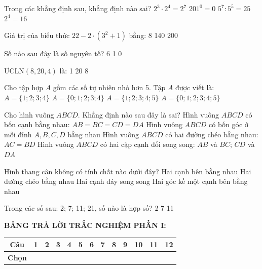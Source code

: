 \documentclass[12pt,a4paper]{article}
\begin{document}
\begin{ex}
Trong các khẳng định sau, khẳng định nào sai?
\choice
{$2^3 \cdot 2^4 = 2^7$}
{\True $201^0 = 0$}
{$5^7 : 5^5 = 25$}
{$2^4 = 16$}
\end{ex}

\begin{ex}
Giá trị của biểu thức $22 - 2 \cdot (3^2 + 1)$ bằng:
\choice
{8}
{140}
{200}
{}
\end{ex}

\begin{ex}
Số nào sau đây là số nguyên tố?
\choice
{6}
{1}
{}
{0}
\end{ex}

\begin{ex}
$\text{ƯCLN}(8, 20, 4)$ là:
\choice
{1}
{20}
{}
{8}
\end{ex}

\begin{ex}
Cho tập hợp $A$ gồm các số tự nhiên nhỏ hơn 5. Tập $A$ được viết là:
\choice
{$A = \{1; 2; 3; 4\}$}
{\True $A = \{0; 1; 2; 3; 4\}$}
{$A = \{1; 2; 3; 4; 5\}$}
{$A = \{0; 1; 2; 3; 4; 5\}$}
\end{ex}

\begin{ex}
Cho hình vuông $ABCD$. Khẳng định nào sau đây là sai?
\choice
{Hình vuông $ABCD$ có bốn cạnh bằng nhau: $AB = BC = CD = DA$}
{Hình vuông $ABCD$ có bốn góc ở mỗi đỉnh $A, B, C, D$ bằng nhau}
{Hình vuông $ABCD$ có hai đường chéo bằng nhau: $AC = BD$}
{\True Hình vuông $ABCD$ có hai cặp cạnh đối song song: $AB$ và $BC$; $CD$ và $DA$}
\end{ex}

\begin{ex}
Hình thang cân không có tính chất nào dưới đây?
\choice
{Hai cạnh bên bằng nhau}
{Hai đường chéo bằng nhau}
{Hai cạnh đáy song song}
{\True Hai góc kề một cạnh bên bằng nhau}
\end{ex}

\begin{ex}
Trong các số sau: 2; 7; 11; 21, số nào là hợp số?
\choice
{2}
{7}
{}
{11}
\end{ex}


\vspace{1mm}
\noindent\textbf{BẢNG TRẢ LỜI TRẮC NGHIỆM PHẦN I:}
\begin{center}
\begin{tabular}{|c|c|c|c|c|c|c|c|c|c|c|c|c|}
\hline
\textbf{Câu} & \textbf{1} & \textbf{2} & \textbf{3} & \textbf{4} & \textbf{5} & \textbf{6} & \textbf{7} & \textbf{8} & \textbf{9} & \textbf{10} & \textbf{11} & \textbf{12} \\
\hline
\textbf{Chọn} & \rule{0pt}{0.65cm} & & & & & & & & & & & \\
\hline
\end{tabular}
\end{center}
\vspace{2mm}
\end{document}
